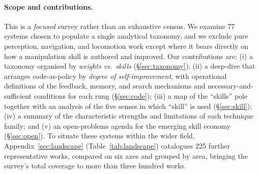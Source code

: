 \documentclass[acmsmall,screen,nonacm]{acmart}
\begin{document}
\paragraph{Scope and contributions.}
This is a \emph{focused} survey rather than an exhaustive census. We examine 77 systems chosen
to populate a single analytical taxonomy, and we exclude pure perception, navigation, and
locomotion work except where it bears directly on how a manipulation skill is authored and
improved. Our contributions are: (i) a taxonomy organised by \emph{weights vs.\ skills}
(\S\ref{sec:taxonomy}); (ii) a deep-dive that arranges code-as-policy by \emph{degree of
self-improvement}, with operational definitions of the feedback, memory, and search mechanisms
and necessary-and-sufficient conditions for each rung (\S\ref{sec:code}); (iii) a map of the
``skills'' pole together with an analysis of the five senses in which ``skill'' is used
(\S\ref{sec:skill}); (iv) a summary of the characteristic strengths and limitations of each
technique family; and (v) an open-problems agenda for the emerging skill economy
(\S\ref{sec:open}). To situate these systems within the wider field,
Appendix~\ref{sec:landscape} (Table~\ref{tab:landscape}) catalogues 225 further representative
works, compared on six axes and grouped by area, bringing the survey's total coverage to more than
three hundred works.
\end{document}
